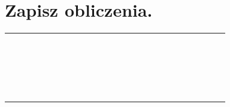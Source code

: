 \documentclass[10pt]{article}
\begin{document}
\section*{Zapisz obliczenia.}
\begin{center}
\begin{tabular}{|c|c|c|c|c|c|c|c|c|c|c|c|c|c|c|c|c|c|c|c|c|c|c|}
\hline
 &  &  &  &  &  &  &  &  &  &  &  &  &  &  &  &  &  &  &  &  &  &  \\
\hline
 &  &  &  &  &  &  &  &  &  &  &  &  &  &  &  &  &  &  &  &  &  &  \\
\hline
 &  &  &  &  &  &  &  &  &  &  &  &  &  &  &  &  &  &  &  &  &  &  \\
\hline
 &  &  &  &  &  &  &  &  &  &  &  &  &  &  &  &  &  &  &  &  &  &  \\
\hline
 &  &  &  &  &  &  &  &  &  &  &  &  &  &  &  &  &  &  &  &  &  &  \\
\hline
 &  &  &  &  &  &  &  &  &  &  &  &  &  &  &  &  &  &  &  &  &  &  \\
\hline
 &  &  &  &  &  &  &  &  &  &  &  &  &  &  &  &  &  &  &  &  &  &  \\
\hline
 &  &  &  &  &  &  &  &  &  &  &  &  &  &  &  &  &  &  &  &  &  &  \\
\hline
 &  &  &  &  &  &  &  &  &  &  &  &  &  &  &  &  &  &  &  &  &  &  \\
\hline
 &  &  &  &  &  &  &  &  &  &  &  &  &  &  &  &  &  &  &  &  &  &  \\
\hline
 &  &  &  &  &  &  &  &  &  &  &  &  &  &  &  &  &  &  &  &  &  &  \\
\hline
 &  &  &  &  &  &  &  &  &  &  &  &  &  &  &  &  &  &  &  &  &  &  \\
\hline
 &  &  &  &  &  &  &  &  &  &  &  &  &  &  &  &  &  &  &  &  &  &  \\
\hline
 &  &  &  &  &  &  &  &  &  &  &  &  &  &  &  &  &  &  &  &  &  &  \\
\hline
 &  &  &  &  &  &  &  &  &  &  &  &  &  &  &  &  &  &  &  &  &  &  \\
\hline
 &  &  &  &  &  &  &  &  &  &  &  &  &  &  &  &  &  &  &  &  &  &  \\
\hline
 &  &  &  &  &  &  &  &  &  &  &  &  &  &  &  &  &  &  &  &  &  &  \\
\hline
 &  &  &  &  &  &  &  &  &  &  &  &  &  &  &  &  &  &  &  &  &  &  \\
\hline
 &  &  &  &  &  &  &  &  &  &  &  &  &  &  &  &  &  &  &  &  &  &  \\
\hline
 &  &  &  &  &  &  &  &  &  &  &  &  &  &  &  &  &  &  &  &  &  &  \\

\end{tabular}
\end{center}
\end{document}
